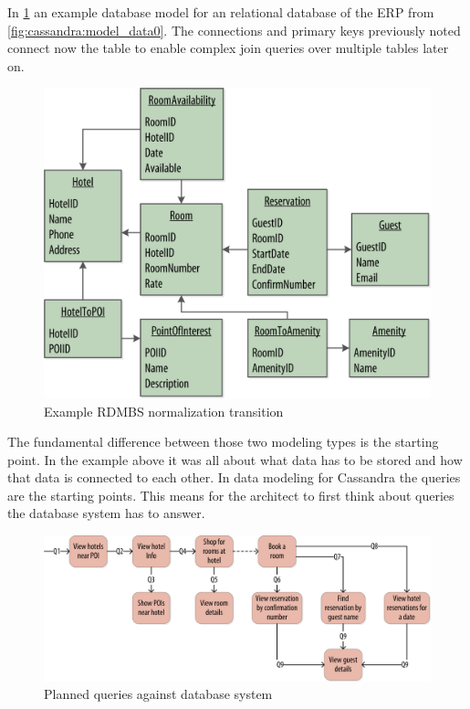 In \ref{fig:cassandra:model_data1} an example database model for an relational database of the ERP from \ref{fig:cassandra:model_data0}.
The connections and primary keys previously noted connect now the table to enable complex join queries over multiple tables later on.

\begin{figure}[H]
    \centering
    \includegraphics[width=0.75\columnwidth]{img/model_example_rdbms_step1.png}
    \caption{Example RDMBS normalization transition \autocite{cassandra_oreilly}}
    \label{fig:cassandra:model_data1}
\end{figure}

The fundamental difference between those two modeling types is the starting point. In the example above it was all about what data has to be stored and how that data is connected to each other.
In data modeling for Cassandra the queries are the starting points. This means for the architect to first think about queries the database system has to answer.

\begin{figure}[H]
    \centering
    \includegraphics[width=0.75\columnwidth]{img/model_example_queries_step2.png}
    \caption{Planned queries against database system \autocite{cassandra_oreilly}}
    \label{fig:cassandra:model_data2}
\end{figure}

